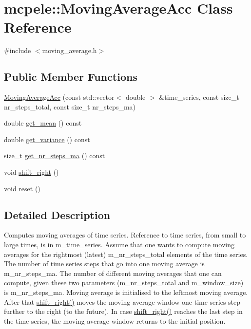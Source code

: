 \hypertarget{classmcpele_1_1MovingAverageAcc}{\section{mcpele\-:\-:\-Moving\-Average\-Acc \-Class \-Reference}
\label{classmcpele_1_1MovingAverageAcc}
}


{\ttfamily \#include $<$moving\-\_\-average.\-h$>$}

\subsection*{\-Public \-Member \-Functions}
\begin{DoxyCompactItemize}
\item 
\hyperlink{classmcpele_1_1MovingAverageAcc_ae6fec71cbafebc71e9a905899a7896de}{\-Moving\-Average\-Acc} (const std\-::vector$<$ double $>$ \&time\-\_\-series, const size\-\_\-t nr\-\_\-steps\-\_\-total, const size\-\_\-t nr\-\_\-steps\-\_\-ma)
\item 
double \hyperlink{classmcpele_1_1MovingAverageAcc_a9425234b23392b4e5bba42fc97d16003}{get\-\_\-mean} () const 
\item 
double \hyperlink{classmcpele_1_1MovingAverageAcc_a773b8ca120bbdf022d2bc47a0675fae0}{get\-\_\-variance} () const 
\item 
size\-\_\-t \hyperlink{classmcpele_1_1MovingAverageAcc_a5445445958b84d53fb79de34c755b989}{get\-\_\-nr\-\_\-steps\-\_\-ma} () const 
\item 
void \hyperlink{classmcpele_1_1MovingAverageAcc_a9e2cdb6a33be91c777151422405f7e0e}{shift\-\_\-right} ()
\item 
void \hyperlink{classmcpele_1_1MovingAverageAcc_ac949ea89cec25587bcb3ba0d9a07c3fb}{reset} ()
\end{DoxyCompactItemize}


\subsection{\-Detailed \-Description}
\-Computes moving averages of time series. \-Reference to time series, from small to large times, is in m\-\_\-time\-\_\-series. \-Assume that one wants to compute moving averages for the rightmost (latest) m\-\_\-nr\-\_\-steps\-\_\-total elements of the time series. \-The number of time series steps that go into one moving average is m\-\_\-nr\-\_\-steps\-\_\-ma. \-The number of different moving averages that one can compute, given these two parameters (m\-\_\-nr\-\_\-steps\-\_\-total and m\-\_\-window\-\_\-size) is m\-\_\-nr\-\_\-steps\-\_\-ma. \-Moving average is initialised to the leftmost moving average. \-After that \hyperlink{classmcpele_1_1MovingAverageAcc_a9e2cdb6a33be91c777151422405f7e0e}{shift\-\_\-right()} moves the moving average window one time series step further to the right (to the future). \-In case \hyperlink{classmcpele_1_1MovingAverageAcc_a9e2cdb6a33be91c777151422405f7e0e}{shift\-\_\-right()} reaches the last step in the time series, the moving average window returns to the initial position. 

